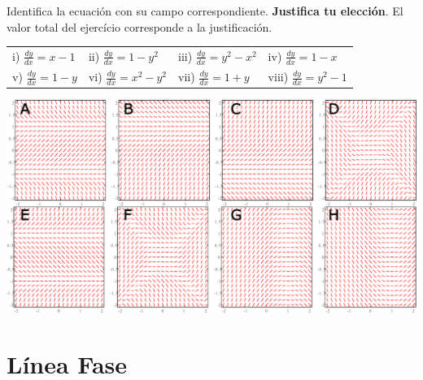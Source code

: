 \documentclass[12pt]{exam}
\begin{document}
\begin{questions}
     \question%
     Identifica la ecuación con su campo correspondiente. \textbf{Justifica tu elección}. El valor total del ejercício corresponde a la justificación.
     
     \begin{tabular}{llll}
       i) $\frac{dy}{dx}=x-1$   & ii) $\frac{dy}{dx}=1-y^2$ & iii) $\frac{dy}{dx}=y^2-x^2$ & iv) $\frac{dy}{dx}=1-x$ \\
         v) $\frac{dy}{dx}=1-y$ & vi) $\frac{dy}{dx}=x^2-y^2$ & vii) $\frac{dy}{dx}=1+y$ & viii) $\frac{dy}{dx}=y^2-1$
     \end{tabular}
     
     \includegraphics[scale=.48]{F1T1.pdf}


    \section{Línea Fase}


\end{questions}
\end{document}
